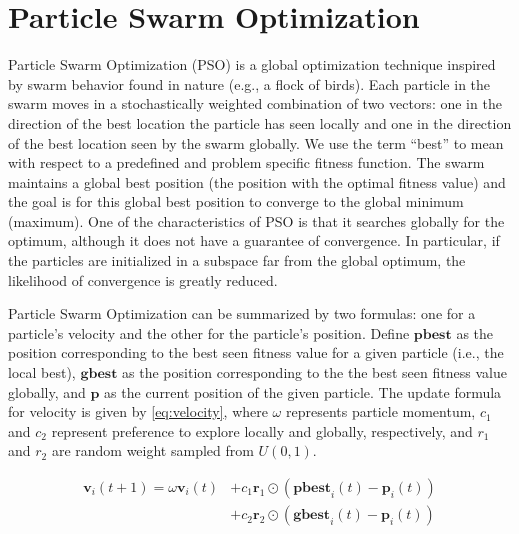 \section{Particle Swarm Optimization}\label{sec:pso}
Particle Swarm Optimization (PSO) \cite{pso} is a global optimization technique
inspired by swarm behavior found in nature (e.g., a flock of birds).
Each particle in the swarm moves in a stochastically weighted
combination of two vectors: one in the direction of the best location the
particle has seen locally and one in the direction of the best location seen by
the swarm globally. We use the term ``best'' to mean with respect to a predefined and
problem specific fitness function.
The swarm maintains a global best position (the position
with the optimal fitness value) and the goal is for this global best position to
converge to the global minimum (maximum).
One of the characteristics of PSO is that it searches globally for the optimum,
although it does not have a guarantee of convergence.
In particular, if the particles are initialized in a subspace far from the
global optimum, the likelihood of convergence is greatly reduced.

Particle Swarm Optimization can be summarized by two formulas:
one for a particle's velocity and the other for the particle's position. Define
$\textbf{pbest}$ as the position corresponding to the best seen fitness value
for a given particle (i.e., the local best), $\textbf{gbest}$ as the position
corresponding to the the best seen fitness value globally, and $\textbf{p}$ as
the current position of the given particle. The update formula for velocity is
given by \eqref{eq:velocity}, where $\omega$ represents particle momentum,
$c_1$ and $c_2$ represent preference to explore locally and globally,
respectively, and $r_1$ and $r_2$ are random weight sampled from $U(0, 1)$.


\begin{equation}\label{eq:velocity}
\begin{aligned}
  \textbf{v}_i(t+1) = \omega \textbf{v}_i (t) & +
                                                c_1 \textbf{r}_1\odot (\textbf{pbest}_i(t) -
                                                \textbf{p}_i(t))
  \\
  &+ c_2 \textbf{r}_2 \odot(\textbf{gbest}_i(t) - \textbf{p}_i(t))
\end{aligned}
\end{equation}

